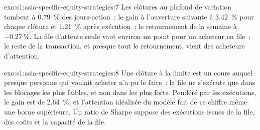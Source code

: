 \begin{solution}{exo:s1:asia-specific-equity-strategies:7}
Les clôtures au plafond de variation tombent à 0.79~\% des jours-action~; le gain à l'ouverture suivante à 3.42~\% pour chaque clôture et 1.21~\% après exécution~; le retournement de la semaine à $-0.27~\%$. La
file d'attente seule vaut environ un point pour un acheteur en file~; le reste de la transaction, et presque tout le retournement, vient des acheteurs d'attention.
\end{solution}

\begin{solution}{exo:s1:asia-specific-equity-strategies:8}
Une clôture à la limite est un cours auquel presque personne qui voulait acheter n'a pu le faire~: la file ne s'exécute que dans les blocages les plus faibles, et non dans les plus forts. Pondéré
par les exécutions, le gain est de 2.64~\%, et l'attention idéalisée du modèle fait de ce chiffre même une borne supérieure. Un ratio de Sharpe suppose des exécutions issues de la file, des coûts et la
capacité de la file.
\end{solution}

